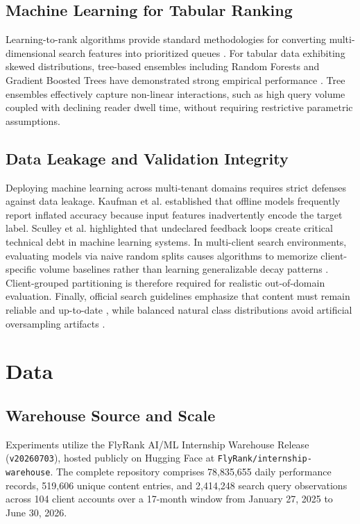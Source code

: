\documentclass[conference]{IEEEtran}
\begin{document}
\subsection{Machine Learning for Tabular Ranking}
Learning-to-rank algorithms provide standard methodologies for converting multi-dimensional search features into prioritized queues \cite{liu2009learning, chapelle2011yahoo}. For tabular data exhibiting skewed distributions, tree-based ensembles including Random Forests \cite{breiman2001random} and Gradient Boosted Trees \cite{chen2016xgboost} have demonstrated strong empirical performance \cite{pedregosa2011scikit}. Tree ensembles effectively capture non-linear interactions, such as high query volume coupled with declining reader dwell time, without requiring restrictive parametric assumptions.

\subsection{Data Leakage and Validation Integrity}
Deploying machine learning across multi-tenant domains requires strict defenses against data leakage. Kaufman et al. \cite{kaufman2012leakage} established that offline models frequently report inflated accuracy because input features inadvertently encode the target label. Sculley et al. \cite{sculley2015hidden} highlighted that undeclared feedback loops create critical technical debt in machine learning systems. In multi-client search environments, evaluating models via naive random splits causes algorithms to memorize client-specific volume baselines rather than learning generalizable decay patterns \cite{kohavi1995study, provost1998case}. Client-grouped partitioning is therefore required for realistic out-of-domain evaluation. Finally, official search guidelines emphasize that content must remain reliable and up-to-date \cite{google2024helpful}, while balanced natural class distributions avoid artificial oversampling artifacts \cite{chawla2002smote}.

\section{Data}
\subsection{Warehouse Source and Scale}
Experiments utilize the FlyRank AI/ML Internship Warehouse Release (\texttt{v20260703}), hosted publicly on Hugging Face at \texttt{FlyRank/internship-warehouse}. The complete repository comprises 78,835,655 daily performance records, 519,606 unique content entries, and 2,414,248 search query observations across 104 client accounts over a 17-month window from January 27, 2025 to June 30, 2026.
\end{document}
